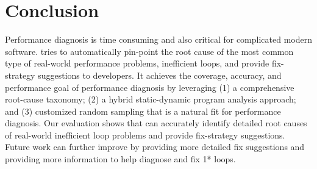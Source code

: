 \section{Conclusion}
\label{sec:con}
Performance diagnosis is time consuming and also critical for 
complicated modern software. \Tool tries to automatically 
pin-point the root cause of
the most common type of real-world performance problems, inefficient loops,
and provide fix-strategy suggestions to developers. It achieves the 
coverage, accuracy, and performance goal of performance diagnosis by leveraging
(1) a comprehensive root-cause taxonomy; (2) a hybrid static-dynamic program
analysis approach; and (3) customized random sampling that is a natural fit for 
performance diagnosis.
Our evaluation shows that \Tool can accurately identify detailed root causes
of real-world inefficient loop problems and provide fix-strategy suggestions. 
Future work can further improve \Tool by providing more detailed fix
suggestions and providing more information to help diagnose and fix
1* loops.

